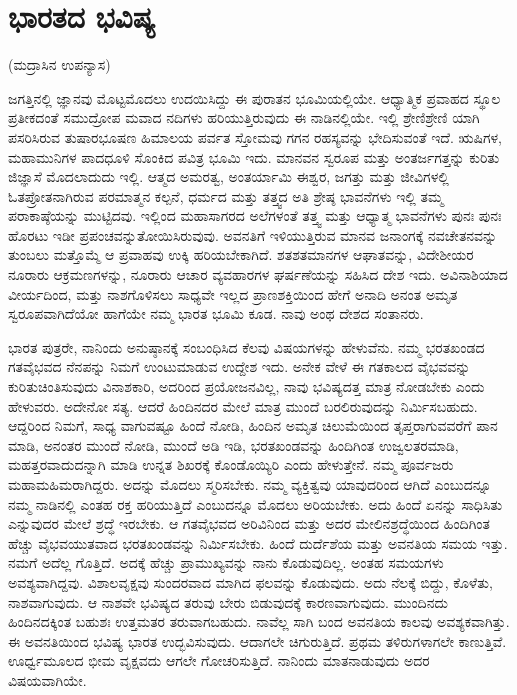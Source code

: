 
\chapter{ಭಾರತದ ಭವಿಷ್ಯ}

\begin{center}
(ಮದ್ರಾಸಿನ ಉಪನ್ಯಾಸ)
\end{center}

ಜಗತ್ತಿನಲ್ಲಿ ಜ್ಞಾನವು ಮೊಟ್ಟಮೊದಲು ಉದಯಿಸಿದ್ದು ಈ ಪುರಾತನ ಭೂಮಿಯಲ್ಲಿಯೇ. ಆಧ್ಯಾತ್ಮಿಕ ಪ್ರವಾಹದ ಸ್ಥೂಲ ಪ್ರತೀಕದಂತೆ ಸಮುದ್ರೋಪ ಮವಾದ ನದಿಗಳು ಹರಿಯುತ್ತಿರುವುದು ಈ ನಾಡಿನಲ್ಲಿಯೇ. ಇಲ್ಲಿ ಶ್ರೇಣಿಶ್ರೇಣಿ ಯಾಗಿ ಪಸರಿಸಿರುವ ತುಷಾರಭೂಷಣ ಹಿಮಾಲಯ ಪರ್ವತ ಸ್ತೋಮವು ಗಗನ ರಹಸ್ಯವನ್ನು ಭೇದಿಸುವಂತೆ ಇದೆ. ಋಷಿಗಳ, ಮಹಾಮುನಿಗಳ ಪಾದಧೂಳಿ ಸೊಂಕಿದ ಪವಿತ್ರ ಭೂಮಿ ಇದು. ಮಾನವನ ಸ್ವರೂಪ ಮತ್ತು ಅಂತರ್ಜಗತ್ತನ್ನು ಕುರಿತು ಜಿಜ್ಞಾಸೆ ಮೊದಲಾದುದು ಇಲ್ಲಿ. ಆತ್ಮದ ಅಮರತ್ವ, ಅಂತರ್ಯಾಮಿ ಈಶ್ವರ, ಜಗತ್ತು ಮತ್ತು ಜೀವಿಗಳಲ್ಲಿ ಓತಪ್ರೋತನಾಗಿರುವ ಪರಮಾತ್ಮನ ಕಲ್ಪನೆ, ಧರ್ಮದ ಮತ್ತು ತತ್ತ್ವದ ಅತಿ ಶ್ರೇಷ್ಠ ಭಾವನೆಗಳು ಇಲ್ಲಿ ತಮ್ಮ ಪರಾಕಾಷ್ಠೆಯನ್ನು ಮುಟ್ಟಿದವು. ಇಲ್ಲಿಂದ ಮಹಾಸಾಗರದ ಅಲೆಗಳಂತೆ ತತ್ತ್ವ ಮತ್ತು ಆಧ್ಯಾತ್ಮ ಭಾವನೆಗಳು ಪುನಃ ಪುನಃ ಹೊರಟು ಇಡೀ ಪ್ರಪಂಚವನ್ನುತೋಯಿಸಿರುವುವು. ಅವನತಿಗೆ ಇಳಿಯುತ್ತಿರುವ ಮಾನವ ಜನಾಂಗಕ್ಕೆ ನವಚೇತನವನ್ನು ತುಂಬಲು ಮತ್ತೊಮ್ಮೆ ಆ ಪ್ರವಾಹವು ಉಕ್ಕಿ ಹರಿಯಬೇಕಾಗಿದೆ. ಶತಶತಮಾನಗಳ ಆಘಾತವನ್ನು, ವಿದೇಶೀಯರ ನೂರಾರು ಆಕ್ರಮಣಗಳನ್ನು, ನೂರಾರು ಆಚಾರ ವ್ಯವಹಾರಗಳ ಘರ್ಷಣೆಯನ್ನು ಸಹಿಸಿದ ದೇಶ ಇದು. ಅವಿನಾಶಿಯಾದ ವೀರ್ಯದಿಂದ, ಮತ್ತು ನಾಶಗೊಳಿಸಲು ಸಾಧ್ಯವೇ ಇಲ್ಲದ ಪ್ರಾಣಶಕ್ತಿಯಿಂದ ಹೇಗೆ ಅನಾದಿ ಅನಂತ ಅಮೃತ ಸ್ವರೂಪವಾಗಿದೆಯೋ ಹಾಗೆಯೇ ನಮ್ಮ ಭಾರತ ಭೂಮಿ ಕೂಡ. ನಾವು ಅಂಥ ದೇಶದ ಸಂತಾನರು. 

ಭಾರತ ಪುತ್ರರೇ, ನಾನಿಂದು ಅನುಷ್ಠಾನಕ್ಕೆ ಸಂಬಂಧಿಸಿದ ಕೆಲವು ವಿಷಯಗಳನ್ನು ಹೇಳುವೆನು. ನಮ್ಮ ಭರತಖಂಡದ ಗತವೈಭವದ ನೆನಪನ್ನು ನಿಮಗೆ ಉಂಟುಮಾಡುವ ಉದ್ದೇಶ ಇದು. ಅನೇಕ ವೇಳೆ ಈ ಗತಕಾಲದ ವೈಭವವನ್ನು ಕುರಿತುಚಿಂತಿಸುವುದು ವಿನಾಶಕಾರಿ, ಅದರಿಂದ ಪ್ರಯೋಜನವಿಲ್ಲ, ನಾವು ಭವಿಷ್ಯದತ್ತ ಮಾತ್ರ ನೋಡಬೇಕು ಎಂದು ಹೇಳುವರು. ಅದೇನೋ ಸತ್ಯ. ಆದರೆ ಹಿಂದಿನದರ ಮೇಲೆ ಮಾತ್ರ ಮುಂದೆ ಬರಲಿರುವುದನ್ನು ನಿರ್ಮಿಸಬಹುದು. ಆದ್ದರಿಂದ ನಿಮಗೆ, ಸಾಧ್ಯ ವಾಗುವಷ್ಟೂ ಹಿಂದೆ ನೋಡಿ, ಹಿಂದಿನ ಅಮೃತ ಚಿಲುಮೆಯಿಂದ ತೃಪ್ತರಾಗುವವರೆಗೆ ಪಾನ ಮಾಡಿ, ಅನಂತರ ಮುಂದೆ ನೋಡಿ, ಮುಂದೆ ಅಡಿ ಇಡಿ, ಭರತಖಂಡವನ್ನು ಹಿಂದಿಗಿಂತ ಉಜ್ವಲತರಮಾಡಿ, ಮಹತ್ತರವಾದುದನ್ನಾಗಿ ಮಾಡಿ ಉನ್ನತ ಶಿಖರಕ್ಕೆ ಕೊಂಡೊಯ್ಯಿರಿ ಎಂದು ಹೇಳುತ್ತೇನೆ. ನಮ್ಮ ಪೂರ್ವಜರು ಮಹಾಮಹಿಮರಾಗಿದ್ದರು. ಅದನ್ನು ಮೊದಲು ಸ್ಮರಿಸಬೇಕು. ನಮ್ಮ ವ್ಯಕ್ತಿತ್ವವು ಯಾವುದರಿಂದ ಆಗಿದೆ ಎಂಬುದನ್ನೂ ನಮ್ಮ ನಾಡಿನಲ್ಲಿ ಎಂತಹ ರಕ್ತ ಹರಿಯುತ್ತಿದೆ ಎಂಬುದನ್ನೂ ಮೊದಲು ಅರಿಯಬೇಕು. ಅದು ಹಿಂದೆ ಏನನ್ನು ಸಾಧಿಸಿತು ಎನ್ನುವುದರ ಮೇಲೆ ಶ್ರದ್ಧೆ ಇರಬೇಕು. ಆ ಗತವೈಭವದ ಅರಿವಿನಿಂದ ಮತ್ತು ಅದರ ಮೇಲಿನಶ್ರದ್ಧೆಯಿಂದ ಹಿಂದಿಗಿಂತ ಹೆಚ್ಚು ವೈಭವಯುತವಾದ ಭರತಖಂಡವನ್ನು ನಿರ್ಮಿಸಬೇಕು. ಹಿಂದೆ ದುರ್ದೆಶೆಯ ಮತ್ತು ಅವನತಿಯ ಸಮಯ ಇತ್ತು. ನಮಗೆ ಅದೆಲ್ಲ ಗೊತ್ತಿದೆ. ಅದಕ್ಕೆ ಹೆಚ್ಚು ಪ್ರಾಮುಖ್ಯವನ್ನು ನಾನು ಕೊಡುವುದಿಲ್ಲ. ಅಂತಹ ಸಮಯಗಳು ಅವಶ್ಯವಾಗಿದ್ದವು. ವಿಶಾಲವೃಕ್ಷವು ಸುಂದರವಾದ ಮಾಗಿದ ಫಲವನ್ನು ಕೊಡುವುದು. ಅದು ನೆಲಕ್ಕೆ ಬಿದ್ದು, ಕೊಳೆತು, ನಾಶವಾಗುವುದು. ಆ ನಾಶವೇ ಭವಿಷ್ಯದ ತರುವು ಬೇರು ಬಿಡುವುದಕ್ಕೆ ಕಾರಣವಾಗುವುದು. ಮುಂದಿನದು ಹಿಂದಿನದಕ್ಕಿಂತ ಬಹುಶಃ ಉತ್ತಮತರ ತರುವಾಗಬಹುದು. ನಾವೆಲ್ಲ ಸಾಗಿ ಬಂದ ಅವನತಿಯ ಕಾಲವು ಅವಶ್ಯಕವಾಗಿತ್ತು. ಈ ಅವನತಿಯಿಂದ ಭವಿಷ್ಯ ಭಾರತ ಉದ್ಭವಿಸುವುದು. ಆದಾಗಲೇ ಚಿಗುರುತ್ತಿದೆ. ಪ್ರಥಮ ತಳಿರುಗಳಾಗಲೇ ಕಾಣುತ್ತಿವೆ. ಊರ್ಧ್ವಮೂಲದ ಭೀಮ ವೃಕ್ಷವದು ಆಗಲೇ ಗೋಚರಿಸುತ್ತಿದೆ. ನಾನಿಂದು ಮಾತನಾಡುವುದು ಅದರ ವಿಷಯವಾಗಿಯೇ. 

